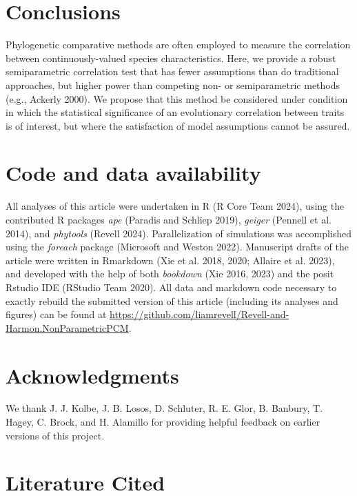 \documentclass[fleqn,10pt,lineno]{wlpeerj} %
\begin{document}
\section{Conclusions}\label{conclusions}

Phylogenetic comparative methods are often employed to measure the correlation between continuously-valued species characteristics. Here, we provide a robust semiparametric correlation test that has fewer assumptions than do traditional approaches, but higher power than competing non- or semiparametric methods (e.g., Ackerly 2000). We propose that this method be considered under condition in which the statistical significance of an evolutionary correlation between traits is of interest, but where the satisfaction of model assumptions cannot be assured.

\section{Code and data availability}\label{code-and-data-availability}

All analyses of this article were undertaken in R (R Core Team 2024), using the contributed R packages \emph{ape} (Paradis and Schliep 2019), \emph{geiger} (Pennell et al. 2014), and \emph{phytools} (Revell 2024). Parallelization of simulations was accomplished using the \emph{foreach} package (Microsoft and Weston 2022). Manuscript drafts of the article were written in Rmarkdown (Xie et al. 2018, 2020; Allaire et al. 2023), and developed with the help of both \emph{bookdown} (Xie 2016, 2023) and the posit Rstudio IDE (RStudio Team 2020). All data and markdown code necessary to exactly rebuild the submitted version of this article (including its analyses and figures) can be found at \url{https://github.com/liamrevell/Revell-and-Harmon.NonParametricPCM}.

\section{Acknowledgments}\label{acknowledgments}

We thank J. J. Kolbe, J. B. Losos, D. Schluter, R. E. Glor, B. Banbury, T. Hagey, C. Brock, and H. Alamillo for providing helpful feedback on earlier versions of this project.

\section*{Literature Cited}\label{literature-cited}
\end{document}
